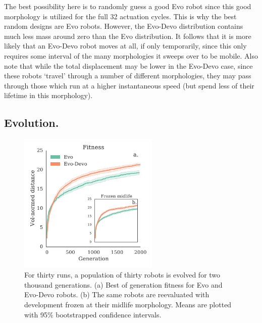 The best possibility here is to randomly guess a good Evo robot since this good morphology is utilized for the full 32 actuation cycles. 
This is why the best random designs are Evo robots.
However, the Evo-Devo distribution contains much less mass around zero than the Evo distribution. It follows that it is more likely that an Evo-Devo robot moves at all, if only temporarily, since this only requires some interval of the many morphologies it sweeps over to be mobile. 
Also note that while the total displacement may be lower in the Evo-Devo case, since these robots `travel' through a number of different morphologies, they may pass through those which run at a higher instantaneous speed (but spend less of their lifetime in this morphology).






\subsection{Evolution.}

\begin{figure}[t]
\centering
\includegraphics[width=0.6\textwidth]{Chapter03/img/main_frozen_gecco}
\caption{\label{fig:main_frozen} For thirty runs, a population of thirty robots is evolved for two thousand generations. (a) Best of generation fitness for Evo and Evo-Devo robots. (b) The same robots are reevaluated with development frozen at their midlife morphology.
Means are plotted with 95\% bootstrapped confidence intervals.}
\end{figure}


